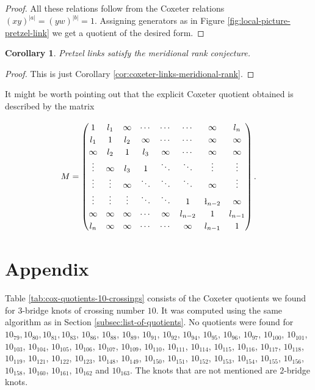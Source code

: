 \documentclass{article}
\newtheorem{corollary}[theorem]{Corollary}
\theoremstyle{definition}
\begin{document}
\begin{proof}
All these relations follow from the Coxeter relations $(xy)^{|a|} = (yw)^{|b|} = 1$. Assigning generators as in Figure \ref{fig:local-picture-pretzel-link} we get a quotient of the desired form.
\end{proof}

\begin{corollary}
Pretzel links satisfy the meridional rank conjecture.
\end{corollary}

\begin{proof}
This is just Corollary \ref{cor:coxeter-links-meridional-rank}.
\end{proof}

It might be worth pointing out that the explicit Coxeter quotient obtained is described by the matrix

$$
\renewcommand\arraystretch{1.2}
M = \left( \begin{matrix}
1 & l_1 & \infty & \cdots & \cdots &\cdots & \infty & l_n \\
l_1 & 1 & l_2 & \infty & \cdots & \cdots & \infty & \infty \\
\infty & l_2 & 1 & l_3 & \infty &\cdots & \infty & \infty \\
\vdots & \infty  & l_3 & 1 & \ddots & \ddots & \vdots & \vdots \\
\vdots & \vdots & \infty & \ddots & \ddots & \ddots & \infty & \vdots \\
\vdots & \vdots & \vdots & \ddots &\ddots & 1 & \l_{n-2} & \infty \\
\infty & \infty & \infty & \cdots & \infty & l_{n-2} & 1 & l_{n-1} \\
l_n & \infty & \infty & \cdots & \cdots & \infty  & l_{n-1} & 1
\end{matrix} \right).$$

\newpage

\appendix
\section{Appendix}\label{sec:data}
Table \ref{tab:cox-quotients-10-crossings} consists of the Coxeter quotients we found for $3$-bridge knots of crossing number $10$. It was computed using the same algorithm as in Section \ref{subsec:list-of-quotients}. No quotients were found for $10_{79}, 10_{80}, 10_{81}, 
10_{83}$, $10_{86}$, $10_{88}$, $10_{89}$, $10_{91}$, $10_{92}$, $10_{94}$, $10_{95}$, $10_{96}$, $10_{97}$,
$10_{100}$, $10_{101}$, $10_{103}$, $10_{104}$, $10_{105}$, $10_{106}$, $10_{107}$, $10_{109}$, $10_{110}$, $10_{111}$, $10_{114}$, $10_{115}$, $10_{116}$, $10_{117}$, $10_{118}$, $10_{119}$, $10_{121}$, $10_{122}$, $10_{123}$,
$10_{148}$, $10_{149}$, $10_{150}$, $10_{151}$, $10_{152}$, $10_{153}$, $10_{154}$, $10_{155}$, $10_{156}$, $10_{158}$,
$10_{160}$, $10_{161}$, $10_{162}$ and $10_{163}$. The knots that are not mentioned are $2$-bridge knots.
\end{document}
